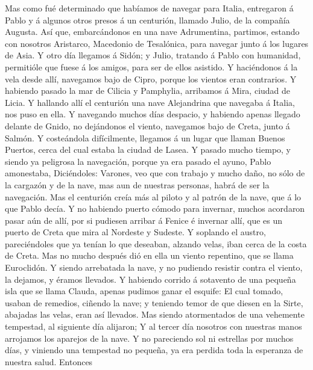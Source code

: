  Mas como fué determinado que habíamos de navegar para
Italia, entregaron á Pablo y á algunos otros presos á un centurión,
llamado Julio, de la compañía Augusta.  Así que,
embarcándonos en una nave Adrumentina, partimos, estando con nosotros
Aristarco, Macedonio de Tesalónica, para navegar junto á los lugares de
Asia.  Y otro día llegamos á Sidón; y Julio, tratando á
Pablo con humanidad, permitióle que fuese á los amigos, para ser de
ellos asistido.  Y haciéndonos á la vela desde allí,
navegamos bajo de Cipro, porque los vientos eran contrarios.
 Y habiendo pasado la mar de Cilicia y Pamphylia, arribamos
á Mira, ciudad de Licia.  Y hallando allí el centurión una
nave Alejandrina que navegaba á Italia, nos puso en ella.  Y
navegando muchos días despacio, y habiendo apenas llegado delante de
Gnido, no dejándonos el viento, navegamos bajo de Creta, junto á Salmón.
 Y costeándola difícilmente, llegamos á un lugar que llaman
Buenos Puertos, cerca del cual estaba la ciudad de Lasea.  Y
pasado mucho tiempo, y siendo ya peligrosa la navegación, porque ya era
pasado el ayuno, Pablo amonestaba,  Diciéndoles: Varones,
veo que con trabajo y mucho daño, no sólo de la cargazón y de la nave,
mas aun de nuestras personas, habrá de ser la navegación. 
Mas el centurión creía más al piloto y al patrón de la nave, que á lo
que Pablo decía.  Y no habiendo puerto cómodo para
invernar, muchos acordaron pasar aún de allí, por si pudiesen arribar á
Fenice é invernar allí, que es un puerto de Creta que mira al Nordeste y
Sudeste.  Y soplando el austro, pareciéndoles que ya tenían
lo que deseaban, alzando velas, iban cerca de la costa de Creta.
 Mas no mucho después dió en ella un viento repentino, que
se llama Euroclidón.  Y siendo arrebatada la nave, y no
pudiendo resistir contra el viento, la dejamos, y éramos llevados.
 Y habiendo corrido á sotavento de una pequeña isla que se
llama Clauda, apenas pudimos ganar el esquife:  El cual
tomado, usaban de remedios, ciñendo la nave; y teniendo temor de que
diesen en la Sirte, abajadas las velas, eran así llevados. 
Mas siendo atormentados de una vehemente tempestad, al siguiente día
alijaron;  Y al tercer día nosotros con nuestras manos
arrojamos los aparejos de la nave.  Y no pareciendo sol ni
estrellas por muchos días, y viniendo una tempestad no pequeña, ya era
perdida toda la esperanza de nuestra salud.  Entonces
